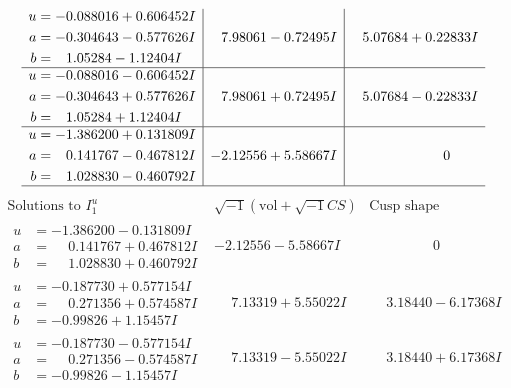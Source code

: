 \documentclass[1p]{elsarticle_modified}
\theoremstyle{definition}
\newcommand{\I}{\sqrt{-1}}
\begin{document}
$$\begin{array}{c|c|c}
\begin{aligned}
u &= -0.088016 + 0.606452 I \\
a &= -0.304643 - 0.577626 I \\
b &= \phantom{-}1.05284 - 1.12404 I\end{aligned}
 & \phantom{-}7.98061 - 0.72495 I & \phantom{-}5.07684 + 0.22833 I \\ \hline\begin{aligned}
u &= -0.088016 - 0.606452 I \\
a &= -0.304643 + 0.577626 I \\
b &= \phantom{-}1.05284 + 1.12404 I\end{aligned}
 & \phantom{-}7.98061 + 0.72495 I & \phantom{-}5.07684 - 0.22833 I \\ \hline\begin{aligned}
u &= -1.386200 + 0.131809 I \\
a &= \phantom{-}0.141767 - 0.467812 I \\
b &= \phantom{-}1.028830 - 0.460792 I\end{aligned}
 & -2.12556 + 5.58667 I & \phantom{-0.000000 } 0\\
 \hline 
 \end{array}$$\newpage$$\begin{array}{c|c|c}  
\text{Solutions to }I^u_{1}& \I (\text{vol} + \sqrt{-1}CS) & \text{Cusp shape}\\
 \hline 
\begin{aligned}
u &= -1.386200 - 0.131809 I \\
a &= \phantom{-}0.141767 + 0.467812 I \\
b &= \phantom{-}1.028830 + 0.460792 I\end{aligned}
 & -2.12556 - 5.58667 I & \phantom{-0.000000 } 0 \\ \hline\begin{aligned}
u &= -0.187730 + 0.577154 I \\
a &= \phantom{-}0.271356 + 0.574587 I \\
b &= -0.99826 + 1.15457 I\end{aligned}
 & \phantom{-}7.13319 + 5.55022 I & \phantom{-}3.18440 - 6.17368 I \\ \hline\begin{aligned}
u &= -0.187730 - 0.577154 I \\
a &= \phantom{-}0.271356 - 0.574587 I \\
b &= -0.99826 - 1.15457 I\end{aligned}
 & \phantom{-}7.13319 - 5.55022 I & \phantom{-}3.18440 + 6.17368 I \\ \hline\begin{aligned}

\end{aligned}
\end{array}$$
\end{document}
